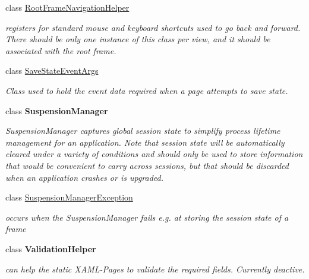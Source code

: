 \begin{DoxyCompactItemize}
class \hyperlink{class_listen_to_me_1_1_common_1_1_root_frame_navigation_helper}{Root\+Frame\+Navigation\+Helper}
\begin{DoxyCompactList}\small\item\em registers for standard mouse and keyboard shortcuts used to go back and forward. There should be only one instance of this class per view, and it should be associated with the root frame. \end{DoxyCompactList}\item 
class \hyperlink{class_listen_to_me_1_1_common_1_1_save_state_event_args}{Save\+State\+Event\+Args}
\begin{DoxyCompactList}\small\item\em Class used to hold the event data required when a page attempts to save state. \end{DoxyCompactList}\item 
class {\bfseries Suspension\+Manager}
\begin{DoxyCompactList}\small\item\em Suspension\+Manager captures global session state to simplify process lifetime management for an application. Note that session state will be automatically cleared under a variety of conditions and should only be used to store information that would be convenient to carry across sessions, but that should be discarded when an application crashes or is upgraded. \end{DoxyCompactList}\item 
class \hyperlink{class_listen_to_me_1_1_common_1_1_suspension_manager_exception}{Suspension\+Manager\+Exception}
\begin{DoxyCompactList}\small\item\em occurs when the Suspension\+Manager fails e.\+g. at storing the session state of a frame \end{DoxyCompactList}\item 
class {\bfseries Validation\+Helper}
\begin{DoxyCompactList}\small\item\em can help the static X\+A\+M\+L-\/\+Pages to validate the required fields. Currently deactive. \end{DoxyCompactList}\end{DoxyCompactItemize}
